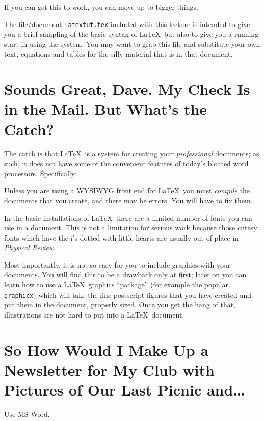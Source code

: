 \documentclass[12pt]{article}
\begin{document}
\bigskip


\rm

\bigskip

If you can get this to work, you can move up to bigger things.

The file/document {\tt latextut.tex\/} included with this lecture
is intended to give you a brief sampling of the basic syntax of
\LaTeX\ but also to give you a running start in using the system.
You may want to grab this file and substitute your own text,
equations and tables for the silly material that is in that
document.

\section{Sounds Great, Dave. My Check Is in the Mail.
But What's the Catch?}

The catch is that \LaTeX\ is a system for creating your {\it
professional\/} documents; as such, it does not have some of the
convenient features of today's bloated word processors.
Specifically:

\medskip
Unless you are using a WYSIWYG front end for \LaTeX\, you
must {\it compile\/} the documents that you create, and there may
be errors.  You will have to fix them.

\medskip
In the basic installations of \LaTeX\ there are a limited number
of fonts you can use in a document.  This is not a limitation for
serious work because those cutesy fonts which have the i's dotted
with little hearts are usually out of place in {\sl Physical
Review}.

\medskip
Most importantly, it is not so easy for you to include
graphics with your documents.  You will find this to be a drawback
only at first; later on you can learn how to use a \LaTeX\
graphics ``package'' (for example the popular {\tt graphicx})
which will take the fine postscript figures that you have created
and put them in the document, properly sized.  Once you get the
hang of that, illustrations are not hard to put into a \LaTeX\
document.

\medskip

\section{So How Would I Make Up a Newsletter for My Club with
Pictures of Our Last Picnic and\dots}

Use MS Word.
\end{document}
